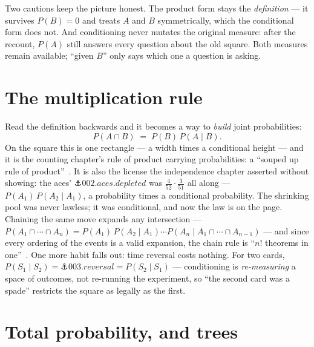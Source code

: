 \begin{narrative}
Two cautions keep the picture honest. The product form stays the
\emph{definition} — it survives $P(B) = 0$ and treats $A$ and $B$
symmetrically, which the conditional form does not. And conditioning
never mutates the original measure: after the recount, $P(A)$ still
answers every question about the old square. Both measures remain
available; ``given $B$'' only says which one a question is asking.

\section{The multiplication rule}

Read the definition backwards and it becomes a way to \emph{build}
joint probabilities:
\[
  P(A \cap B) \;=\; P(B)\,P(A \mid B).
\]
On the square this is one rectangle — a width times a conditional
height — and it is the counting chapter's rule of product carrying
probabilities: a ``souped up rule of
product''~\cite{probability-mit-18-05-reading-3-conditional-probability}.
It is also the license the independence chapter asserted without
showing: the aces' $\anchor{002.aces.depleted}$ was
$\tfrac{4}{52} \cdot \tfrac{3}{51}$ all along —
$P(A_1)\,P(A_2 \mid A_1)$, a probability times a conditional
probability. The shrinking pool was never lawless; it was conditional,
and now the law is on the page. Chaining the same move expands any
intersection — $P(A_1 \cap \cdots \cap A_n) = P(A_1)\,P(A_2 \mid A_1)
\cdots P(A_n \mid A_1 \cap \cdots \cap A_{n-1})$ — and since every
ordering of the events is a valid expansion, the chain rule is
``$n!$ theorems in
one''~\cite{probability-blitzstein-hwang-introduction-to-probability-chs-1-2-excerpt}.
One more habit falls out: time reversal costs nothing. For two cards,
$P(S_1 \mid S_2) = \anchor{003.reversal} = P(S_2 \mid S_1)$ —
conditioning is \emph{re-measuring} a space of outcomes, not re-running
the experiment, so ``the second card was a spade'' restricts the square
as legally as the first.

\section{Total probability, and trees}


\end{narrative}
